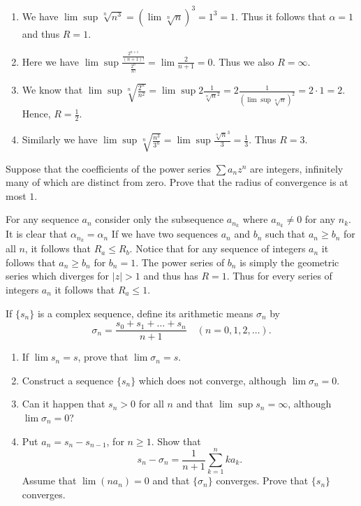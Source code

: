 \begin{solution}
  \begin{enumerate}[label=(\alph*)]
    \item We have $\lim \sup \sqrt[n]{n^3} = (\lim \sqrt[n]{n})^3 = 1^3 = 1$.
      Thus it follows that $\alpha = 1$ and thus $R = 1$.
    \item Here we have $\lim \sup \frac{\frac{2^{n + 1}}{(n + 1)!}}{\frac{2^n}{n!}} = \lim \frac{2}{n + 1} = 0$.
      Thus we also $R = \infty$.
    \item We know that $\lim \sup \sqrt[n]{\frac{2^n}{n^2}} = \lim \sup 2 \frac{1}{\sqrt[n]{n}^2} = 2 \frac{1}{(\lim \sup \sqrt[n]{n})^2} = 2 \cdot 1 = 2$.
      Hence, $R = \frac{1}{2}$.
    \item Similarly we have $\lim \sup \sqrt[n]{\frac{n^3}{3^n}} = \lim \sup \frac{\sqrt[n]{n}^3}{3} = \frac{1}{3}$.
      Thus $R = 3$.
  \end{enumerate}
\end{solution}

\begin{problem}
  Suppose that the coefficients of the power series $\sum a_n z^n$ are integers, infinitely many of which are distinct from zero.
  Prove that the radius of convergence is at most $1$.
\end{problem}

\begin{solution}
  For any sequence $a_n$ consider only the subsequence $a_{n_k}$ where $a_{n_k} \neq 0$ for any $n_k$.
  It is clear that $\alpha_{n_k} = \alpha_{n}$
  If we have two sequences $a_n$ and $b_n$ such that $a_n \ge b_n$ for all $n$, it follows that $R_a \le R_b$.
  Notice that for any sequence of integers $a_n$ it follows that $a_n \ge b_n$ for $b_n = 1$.
  The power series of $b_n$ is simply the geometric series which diverges for $|z| > 1$ and thus has $R = 1$.
  Thus for every series of integers $a_n$ it follows that $R_a \le 1$.
\end{solution}

\setcounter{problem}{13}
\begin{problem}
  If $\{s_n\}$ is a complex sequence, define its arithmetic means $\sigma_n$ by
  \[\sigma_n = \frac{s_0 + s_1 + \ldots + s_n}{n + 1} \quad (n = 0, 1, 2, \ldots).\]
  \begin{enumerate}[label=(\alph*)]
    \item If $\lim s_n = s$, prove that $\lim \sigma_n = s$.
    \item Construct a sequence $\{s_n\}$ which does not converge, although $\lim \sigma_n = 0$.
    \item Can it happen that $s_n > 0$ for all $n$ and that $\lim\sup s_n = \infty$, although $\lim \sigma_n = 0$?
    \item Put $a_n = s_n - s_{n-1}$, for $n \ge 1$.
      Show that
      \[s_n - \sigma_n = \frac{1}{n + 1} \sum_{k = 1}^{n} k a_k .\]
      Assume that $\lim (na_n) = 0$ and that $\{\sigma_n\}$ converges.
      Prove that $\{s_n\}$ converges.
  \end{enumerate}
\end{problem}

